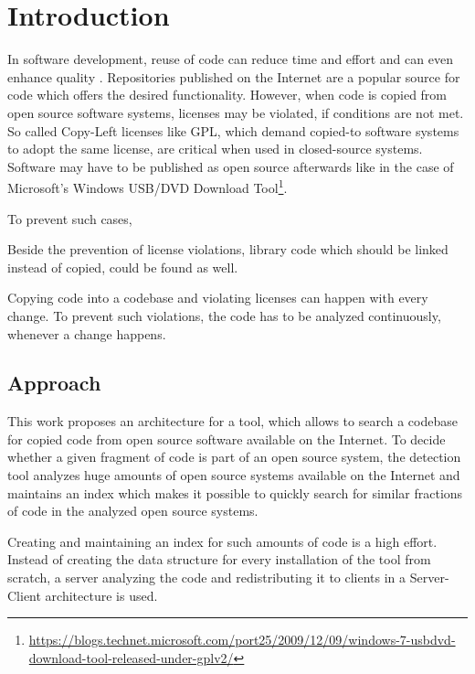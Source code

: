 
\chapter{Introduction}\label{chapter:introduction}
In software development, reuse of code can reduce time and effort and can even enhance quality \cite{krueger1992software}.
Repositories published on the Internet are a popular source for code which offers the desired functionality.
However, when code is copied from open source software systems, licenses may be violated, if conditions are not met.
So called Copy-Left licenses like GPL, which demand copied-to software systems to adopt the same license, are critical when used in closed-source systems.
Software may have to be published as open source afterwards like in the case of Microsoft's \glqq Windows USB/DVD Download Tool\grqq\footnote{\href{https://blogs.technet.microsoft.com/port25/2009/12/09/windows-7-usbdvd-download-tool-released-under-gplv2/}{https://blogs.technet.microsoft.com/port25/2009/12/09/windows-7-usbdvd-download-tool-released-under-gplv2/}}.

To prevent such cases, 

Beside the prevention of license violations, library code which should be linked instead of copied, could be found as well.

Copying code into a codebase and violating licenses can happen with every change.
To prevent such violations, the code has to be analyzed continuously, whenever a change happens.

\section{Approach}\label{section:introduction/problem}
This work proposes an architecture for a tool, which allows to search a codebase for copied code from open source software available on the Internet.
To decide whether a given fragment of code is part of an open source system, the detection tool analyzes huge amounts of open source systems available on the Internet and maintains an index which makes it possible to quickly search for similar fractions of code in the analyzed open source systems.

Creating and maintaining an index for such amounts of code is a high effort.
Instead of creating the data structure for every installation of the tool from scratch, a server analyzing the code and redistributing it to clients in a Server-Client architecture is used.

